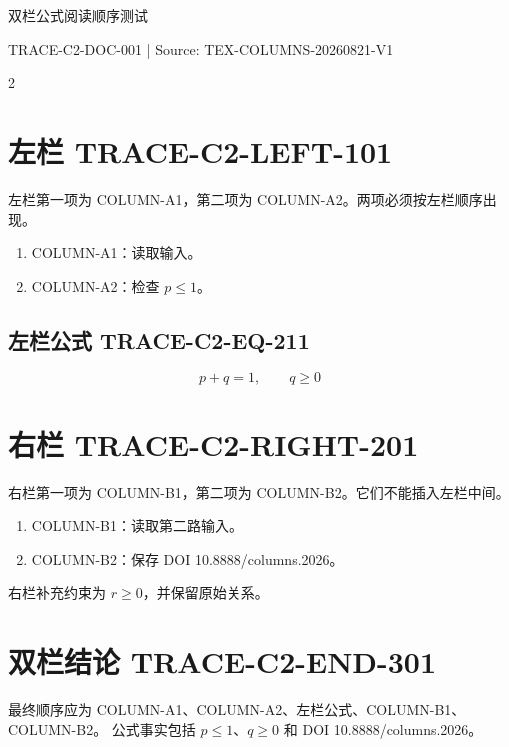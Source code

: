 \documentclass[10pt,a4paper]{ctexart}
\begin{document}
\begin{center}
{\LARGE 双栏公式阅读顺序测试}\par
{\small TRACE-C2-DOC-001 | Source: TEX-COLUMNS-20260821-V1}
\end{center}

\begin{multicols}{2}
\section{左栏 TRACE-C2-LEFT-101}
左栏第一项为 COLUMN-A1，第二项为 COLUMN-A2。两项必须按左栏顺序出现。

\begin{enumerate}
\item COLUMN-A1：读取输入。
\item COLUMN-A2：检查 $p\leq 1$。
\end{enumerate}

\subsection{左栏公式 TRACE-C2-EQ-211}
\begin{equation}
  p + q = 1,\qquad q\geq 0
  \tag{TRACE-C2-EQ-211}
\end{equation}

\columnbreak
\section{右栏 TRACE-C2-RIGHT-201}
右栏第一项为 COLUMN-B1，第二项为 COLUMN-B2。它们不能插入左栏中间。

\begin{enumerate}
\item COLUMN-B1：读取第二路输入。
\item COLUMN-B2：保存 DOI 10.8888/columns.2026。
\end{enumerate}

右栏补充约束为 $r\geq 0$，并保留原始关系。
\end{multicols}

\section{双栏结论 TRACE-C2-END-301}
最终顺序应为 COLUMN-A1、COLUMN-A2、左栏公式、COLUMN-B1、COLUMN-B2。
公式事实包括 $p\leq 1$、$q\geq 0$ 和 DOI 10.8888/columns.2026。
\end{document}
